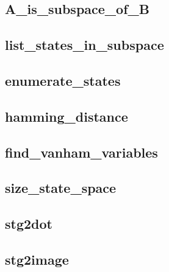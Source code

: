 \documentclass[letterpaper,10pt,english]{sphinxmanual}
\begin{document}
\subsection{A\_is\_subspace\_of\_B}
\label{\detokenize{StateTransitionGraphs:a-is-subspace-of-b}}\label{\detokenize{StateTransitionGraphs:id14}}

\subsection{list\_states\_in\_subspace}
\label{\detokenize{StateTransitionGraphs:list-states-in-subspace}}\label{\detokenize{StateTransitionGraphs:id15}}

\subsection{enumerate\_states}
\label{\detokenize{StateTransitionGraphs:enumerate-states}}\label{\detokenize{StateTransitionGraphs:id16}}

\subsection{hamming\_distance}
\label{\detokenize{StateTransitionGraphs:hamming-distance}}\label{\detokenize{StateTransitionGraphs:id17}}

\subsection{find\_vanham\_variables}
\label{\detokenize{StateTransitionGraphs:id18}}\label{\detokenize{StateTransitionGraphs:find-vanham-variables}}

\subsection{size\_state\_space}
\label{\detokenize{StateTransitionGraphs:id19}}\label{\detokenize{StateTransitionGraphs:size-state-space}}

\subsection{stg2dot}
\label{\detokenize{StateTransitionGraphs:stg2dot}}\label{\detokenize{StateTransitionGraphs:id20}}

\subsection{stg2image}
\label{\detokenize{StateTransitionGraphs:stg2image}}\label{\detokenize{StateTransitionGraphs:id21}}
\end{document}
